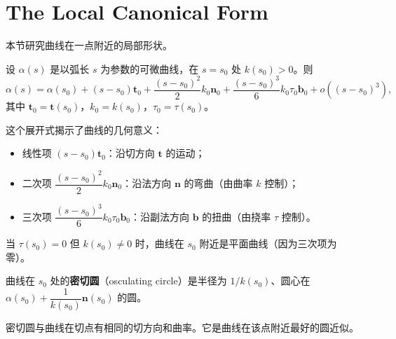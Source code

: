 \section{The Local Canonical Form}\label{sec:local-canonical-form-ch1}

本节研究曲线在一点附近的局部形状。

\begin{Theorem}[曲线在一点的局部标准形式]\label{th:local-canonical-form-ch1}
设 $\alpha(s)$ 是以弧长 $s$ 为参数的可微曲线，在 $s = s_0$ 处 $k(s_0) > 0$。则
\[
\alpha(s) = \alpha(s_0) + (s - s_0)\mathbf{t}_0 + \frac{(s - s_0)^2}{2}k_0\mathbf{n}_0 + \frac{(s - s_0)^3}{6}k_0\tau_0\mathbf{b}_0 + o((s - s_0)^3),
\]
其中 $\mathbf{t}_0 = \mathbf{t}(s_0)$，$k_0 = k(s_0)$，$\tau_0 = \tau(s_0)$。
\end{Theorem}

\begin{Remark}
这个展开式揭示了曲线的几何意义：
\begin{itemize}
\item 线性项 $(s - s_0)\mathbf{t}_0$：沿切方向 $\mathbf{t}$ 的运动；
\item 二次项 $\dfrac{(s - s_0)^2}{2}k_0\mathbf{n}_0$：沿法方向 $\mathbf{n}$ 的弯曲（由曲率 $k$ 控制）；
\item 三次项 $\dfrac{(s - s_0)^3}{6}k_0\tau_0\mathbf{b}_0$：沿副法方向 $\mathbf{b}$ 的扭曲（由挠率 $\tau$ 控制）。
\end{itemize}
\end{Remark}

\begin{Remark}
当 $\tau(s_0) = 0$ 但 $k(s_0) \neq 0$ 时，曲线在 $s_0$ 附近是平面曲线（因为三次项为零）。
\end{Remark}

\begin{Definition}[密切圆]\label{def:osculating-circle-ch1}
曲线在 $s_0$ 处的\textbf{密切圆}（osculating circle）是半径为 $1/k(s_0)$、圆心在 $\alpha(s_0) + \dfrac{1}{k(s_0)}\mathbf{n}(s_0)$ 的圆。
\end{Definition}

\begin{Remark}
密切圆与曲线在切点有相同的切方向和曲率。它是曲线在该点附近最好的圆近似。
\end{Remark}


